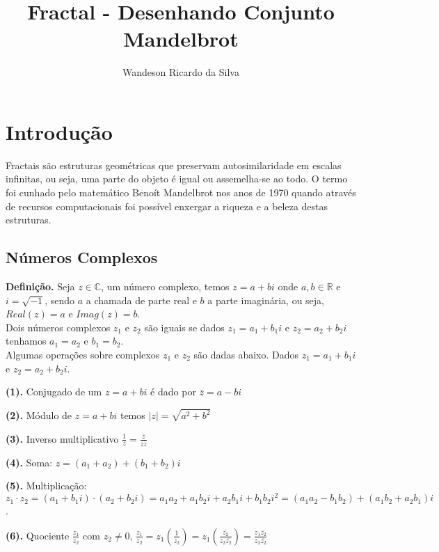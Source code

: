 \documentclass[12pt,a4paper]{article}
\title{Fractal - Desenhando Conjunto Mandelbrot}
\date{}
\author{Wandeson Ricardo da Silva}
\begin{document}
\maketitle

\section{Introdução}
	Fractais são estruturas geométricas que preservam autosimilaridade em escalas infinitas, ou seja, uma parte do objeto é igual ou assemelha-se ao todo. O termo foi cunhado pelo matemático Benoít Mandelbrot nos anos de 1970 quando através de recursos computacionais foi possível enxergar a riqueza e a beleza destas estruturas.
	
\subsection{Números Complexos}

\textbf{Definição.}
	Seja $z \in \mathbb{C}$, um número complexo, temos $z = a + bi$ onde $a,b \in \mathbb{R}$ e $i = \sqrt{-1}$, sendo $a$ a chamada de parte real e $b$ a parte imaginária, ou seja, $Real(z) = a$ e $Imag(z) = b$.\\
	
	Dois números complexos $z_1$ e $z_2$ são iguais se dados $z_1 = a_1 + b_1i$ e $z_2 = a_2 + b_2i$ tenhamos $a_1=a_2$ e $b_1 = b_2$. \\
	 
	Algumas operações sobre complexos $z_1$ e $z_2$ são dadas abaixo. Dados $z_1 = a_1 + b_1i$ e $z_2 = a_2 + b_2i$.
	
	
	\textbf{(1).} Conjugado de um $z = a + bi$ é dado por $\bar{z} = a - bi$

	\textbf{(2).} Módulo de $z = a + bi$ temos $|z| = \sqrt{a^2 + b^2}$
	
	\textbf{(3).} Inverso multiplicativo $\frac{1}{z} = \frac{\bar{z}}{z\bar{z}}$
		
	\textbf{(4).} Soma: $z = (a_1 + a_2 )+ (b_1 + b_2)i$ 
	
	\textbf{(5).} Multiplicação: $ z_1 \cdot z_2 = (a_1 + b_1 i)\cdot(a_2 + b_2 i) = a_1 a_2 + a_1b_2i + a_2b_1i + b_1b_2i^2 = (a_1a_2 - b_1b_2) + (a_1b_2 + a_2b_1)i$.
	
	\textbf{(6).} Quociente $\frac{z_1}{z_2}$ com $z_2 \neq 0$, $\frac{z_1}{z_2} = z_1 \left( \frac{1}{z_2}\right) = z_1 \left( \frac{\bar{z_2}}{z_2\bar{z_2}}\right) = \frac{z_1\bar{z_2}}{z_2\bar{z_2}}$
	
	\newpage
	
\end{document}
